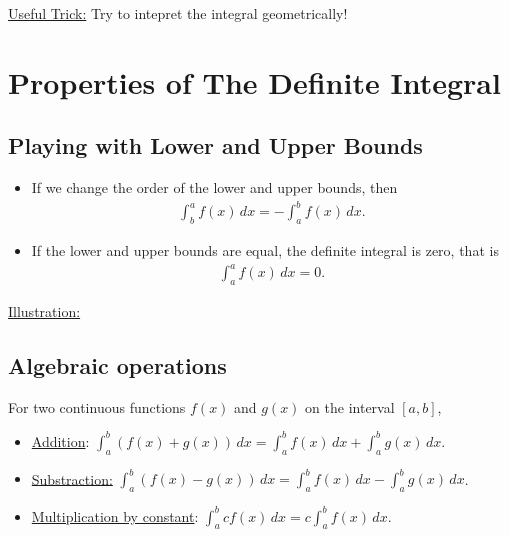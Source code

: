 \documentclass[12pt,a4paper]{article}
\begin{document}
	\vfill
	
	\underline{Useful Trick:} Try to intepret the integral geometrically!
	
	\newpage
	
	\section{Properties of The Definite Integral}
	
	\subsection{Playing with Lower and Upper Bounds}
	\begin{itemize}
	\item If we change the order of the lower and upper bounds, then
		\begin{align*}
		\int_b^a f(x) \, dx = - \int_a^b f(x) \, dx .
		\end{align*}
	\item If the lower and upper bounds are equal, the definite integral is zero, that is
		\begin{align*}
		\int_a^a f(x) \, dx = 0 .
		\end{align*}
	\end{itemize}
	
	\vspace*{16pt}
	
	\underline{Illustration:}
	
	\begin{center}
	\end{center}
	
	\subsection{Algebraic operations}
	For two continuous functions $f(x)$ and $g(x)$ on the interval $[a, b]$,
	\begin{itemize}
	\item \underline{Addition}: $\displaystyle \int_a^b (f (x) + g(x)) \, dx = \int_a^b f(x) \, dx + \int_a^b g(x) \, dx$.
	\item \underline{Substraction:} $\displaystyle \int_a^b (f (x) - g(x)) \, dx = \int_a^b f(x) \, dx - \int_a^b g(x) \, dx$.
	\item \underline{Multiplication by constant}: $\displaystyle \int_a^b c f(x) \, dx = c \int_a^b f(x) \, dx$.
	\end{itemize}
	
\end{document}
